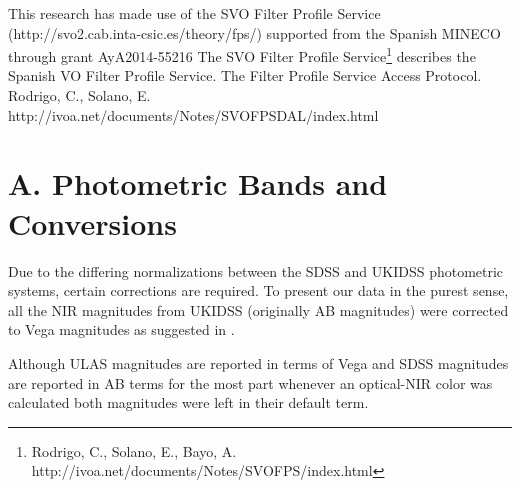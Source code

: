 \documentclass[usenatbib]{mnras}
\begin{document}
This research has made use of the SVO Filter Profile Service
(http://svo2.cab.inta-csic.es/theory/fps/) supported from the Spanish
MINECO through grant AyA2014-55216 
The SVO Filter Profile Service\footnote{Rodrigo, C., Solano, E., Bayo, A. http://ivoa.net/documents/Notes/SVOFPS/index.html}
describes the Spanish VO Filter Profile Service. 
The Filter Profile Service Access Protocol. Rodrigo, C., Solano, E. http://ivoa.net/documents/Notes/SVOFPSDAL/index.html

\newpage

\appendix

\section{A. Photometric Bands and Conversions}
    Due to the differing normalizations between the
    SDSS and  UKIDSS photometric systems, certain corrections are required.  To present
    our data in the  purest sense, all the NIR magnitudes from UKIDSS
    (originally AB magnitudes)  were corrected to Vega magnitudes as
    suggested in \citet{Hewett2006}.
    
    Although ULAS magnitudes are reported in terms of Vega and SDSS
    magnitudes are reported in AB terms for the most part whenever an
    optical-NIR color was calculated both magnitudes were left in their
    default term.
    
\end{document}
